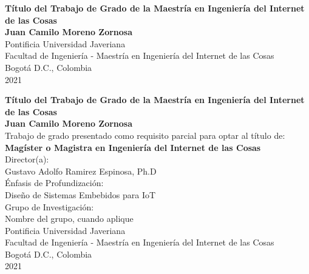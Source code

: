 \begin{center}
\begin{figure}
\centering%
%
\end{figure}
\thispagestyle{empty} \vspace*{1.0cm} \textbf{\huge
Título del Trabajo de Grado de la Maestría en Ingeniería del Internet de las Cosas}\\[2.5cm]
\Large\textbf{Juan Camilo Moreno Zornosa}\\[2.5cm]
\small Pontificia Universidad Javeriana\\
Facultad de Ingeniería - Maestría en Ingeniería del Internet de las Cosas\\
Bogotá D.C., Colombia\\
2021\\
\end{center}


\newpage
\begin{center}
\thispagestyle{empty} \vspace*{0cm} \textbf{\huge
Título del Trabajo de Grado de la Maestría en Ingeniería del Internet de las Cosas}\\[2.5cm]
\Large\textbf{Juan Camilo Moreno Zornosa}\\[2.5cm]
\small Trabajo de grado presentado como requisito parcial para optar al título de:\\
\textbf{Magíster o Magistra en Ingeniería del Internet de las Cosas}\\[2.0cm]
Director(a):\\
Gustavo Adolfo Ramirez Espinosa, Ph.D\\[2.0cm]
Énfasis de Profundización:\\
Diseño de Sistemas Embebidos para IoT\\ %
Grupo de Investigación:\\
Nombre del grupo, cuando aplique\\[1.5cm]
Pontificia Universidad Javeriana\\
Facultad de Ingeniería - Maestría en Ingeniería del Internet de las Cosas\\
Bogotá D.C., Colombia\\
2021\\
\end{center}

